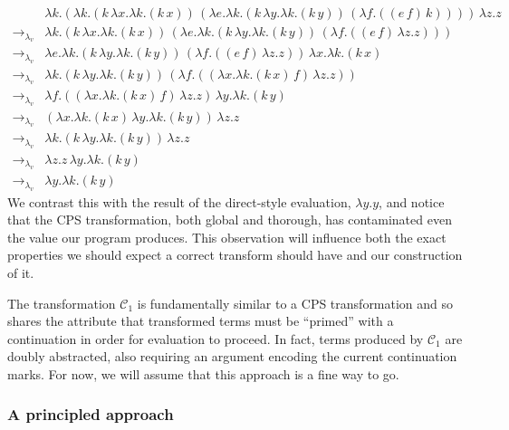 \documentclass[ms,electronic,twosidetoc,letterpaper,chaptercenter,parttop]{byumsphd}
\begin{document}
\begin{align*}
            &\lambda k.(\lambda k.(k\,\lambda x.\lambda k.(k\,x))\,(\lambda e.\lambda k.(k\,\lambda y.\lambda k.(k\,y))\,(\lambda f.((e\,f)\,k))))\,\lambda z.z\\
\rightarrow_{\lambda_{v}} &\lambda k.(k\,\lambda x.\lambda k.(k\,x))\,(\lambda e.\lambda k.(k\,\lambda y.\lambda k.(k\,y))\,(\lambda f.((e\,f)\,\lambda z.z)))\\
\rightarrow_{\lambda_{v}} &\lambda e.\lambda k.(k\,\lambda y.\lambda k.(k\,y))\,(\lambda f.((e\,f)\,\lambda z.z))\,\lambda x.\lambda k.(k\,x)\\
\rightarrow_{\lambda_{v}} &\lambda k.(k\,\lambda y.\lambda k.(k\,y))\,(\lambda f.((\lambda x.\lambda k.(k\,x)\,f)\,\lambda z.z))\\
\rightarrow_{\lambda_{v}} &\lambda f.((\lambda x.\lambda k.(k\,x)\,f)\,\lambda z.z)\,\lambda y.\lambda k.(k\,y)\\
\rightarrow_{\lambda_{v}} &(\lambda x.\lambda k.(k\,x)\,\lambda y.\lambda k.(k\,y))\,\lambda z.z\\
\rightarrow_{\lambda_{v}} &\lambda k.(k\,\lambda y.\lambda k.(k\,y))\,\lambda z.z\\
\rightarrow_{\lambda_{v}} &\lambda z.z\,\lambda y.\lambda k.(k\,y)\\
\rightarrow_{\lambda_{v}} &\lambda y.\lambda k.(k\,y)
\end{align*}
We contrast this with the result of the direct-style evaluation, $\lambda y.y$, and notice 
that the CPS transformation, both global and thorough, has contaminated even the value our 
program produces. This observation will influence both the exact properties we should 
expect a correct transform should have and our construction of it.


The transformation $\mathcal{C}_{1}$ is fundamentally similar to a CPS transformation and 
so shares the attribute that transformed terms must be ``primed'' with a continuation in 
order for evaluation to proceed. In fact, terms produced by $\mathcal{C}_{1}$ are doubly 
abstracted, also requiring an argument encoding the current continuation marks. For now, 
we will assume that this approach is a fine way to go.

\subsubsection{A principled approach}
\end{document}
